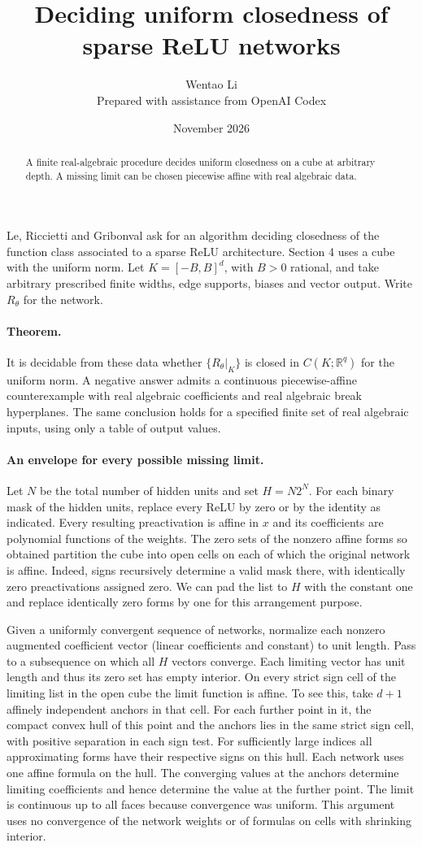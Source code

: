 \documentclass[10pt]{article}
\title{Deciding uniform closedness of sparse ReLU networks}
\author{Wentao Li\\{\small Prepared with assistance from OpenAI Codex}}
\date{November 2026}
\begin{document}
\maketitle
\begin{abstract}
A finite real-algebraic procedure decides uniform closedness on a cube at arbitrary depth. A missing limit can be chosen piecewise affine with real algebraic data.
\end{abstract}
Le, Riccietti and Gribonval ask for an algorithm deciding closedness of the function class associated to a sparse ReLU architecture. Section 4 uses a cube with the uniform norm. Let $K=[-B,B]^d$, with $B>0$ rational, and take arbitrary prescribed finite widths, edge supports, biases and vector output. Write $R_\theta$ for the network.
\paragraph{Theorem.} It is decidable from these data whether $\{R_\theta|_K\}$ is closed in $C(K;\mathbb R^q)$ for the uniform norm. A negative answer admits a continuous piecewise-affine counterexample with real algebraic coefficients and real algebraic break hyperplanes. The same conclusion holds for a specified finite set of real algebraic inputs, using only a table of output values.

\paragraph{An envelope for every possible missing limit.} Let $N$ be the total number of hidden units and set $H=N2^N$. For each binary mask of the hidden units, replace every ReLU by zero or by the identity as indicated. Every resulting preactivation is affine in $x$ and its coefficients are polynomial functions of the weights. The zero sets of the nonzero affine forms so obtained partition the cube into open cells on each of which the original network is affine. Indeed, signs recursively determine a valid mask there, with identically zero preactivations assigned zero. We can pad the list to $H$ with the constant one and replace identically zero forms by one for this arrangement purpose.

Given a uniformly convergent sequence of networks, normalize each nonzero augmented coefficient vector (linear coefficients and constant) to unit length. Pass to a subsequence on which all $H$ vectors converge. Each limiting vector has unit length and thus its zero set has empty interior. On every strict sign cell of the limiting list in the open cube the limit function is affine. To see this, take $d+1$ affinely independent anchors in that cell. For each further point in it, the compact convex hull of this point and the anchors lies in the same strict sign cell, with positive separation in each sign test. For sufficiently large indices all approximating forms have their respective signs on this hull. Each network uses one affine formula on the hull. The converging values at the anchors determine limiting coefficients and hence determine the value at the further point. The limit is continuous up to all faces because convergence was uniform. This argument uses no convergence of the network weights or of formulas on cells with shrinking interior.
\end{document}
